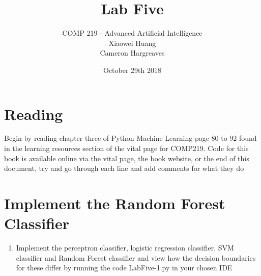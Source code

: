 \documentclass[12pt]{article}
\begin{document}


\date{October 29th 2018}
 
 
\title{Lab Five} %
\author{COMP 219 - Advanced Artificial Intelligence \\
		Xiaowei Huang \\ 
		Cameron Hargreaves\\}
 
\maketitle

\section{Reading}
Begin by reading chapter three of Python Machine Learning page 80 to 92 found in the learning resources section of the vital page for COMP219. Code for this book is available online via the vital page, the book website, or the end of this document, try and go through each line and add comments for what they do

\section{Implement the Random Forest Classifier}
\begin{enumerate}
\item Implement the perceptron classifier, logistic regression classifier, SVM classifier and Random Forest classifier and view how the decision boundaries for these differ by running the code LabFive-1.py in your chosen IDE
\end{enumerate}
\end{document}

